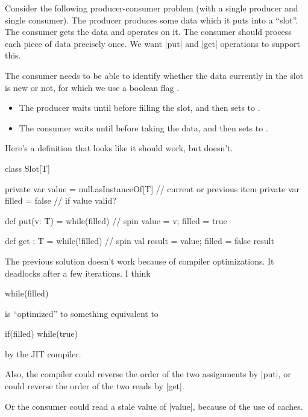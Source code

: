

\begin{slide}

Consider the following producer-consumer problem (with a single producer and
single consumer).  The producer produces some data which it puts into a
``slot''.  The consumer gets the data and operates on it.  The consumer should
process each piece of data precisely once.  We want |put| and |get| operations
to support this. 

The consumer needs to be able to identify whether the data currently
in the slot is new or not, for which we use a boolean flag .
%
\begin{itemize}
\item The producer waits until  before filling the slot,
and then sets  to .

\item The consumer waits until  before taking the data,
and then sets  to .
\end{itemize}

\end{slide}


\begin{slide}

Here's a definition that looks like it should work, but doesn't.

\begin{scala}
class Slot[T]{
  private var value = null.asInstanceOf[T] // current or previous item
  private var filled = false                 // if value valid?

  def put(v: T) = {
    while(filled){  } // spin
    value = v; filled = true
  }

  def get : T = {
    while(!filled){  } // spin
    val result = value; filled = false
    result
  }
}
\end{scala}
\end{slide}


\begin{slide}

The previous solution doesn't work because of compiler optimizations.  It
deadlocks after a few iterations.  I think  
\begin{scala}
    while(filled){  } 
\end{scala}
is ``optimized'' to something equivalent to
\begin{scala}
    if(filled){ while(true){} }
\end{scala}
by the JIT compiler.

Also, the compiler could reverse the order of the two assignments by |put|, or
could reverse the order of the two reads by |get|.  

Or the consumer could read a stale value of |value|, because of the use of
caches.
\end{slide}

